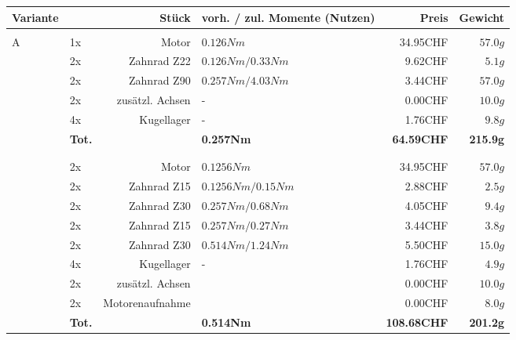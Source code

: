     \begin{longtable}{p{0.5cm}p{0.8cm}rp{3cm}rr}
    \textbf{Variante} & \multicolumn{2}{r}{\textbf{Stück}} & \textbf{vorh. / zul. Momente (Nutzen)} & \textbf{Preis} & \textbf{Gewicht} \\\hline
          &       &                 &                      &          &  \\
    \multirow{9}[2]{*}{A}
          & 1x    & Motor           & $0.126 Nm$           & 34.95CHF & $57.0 g$ \\
          & 2x    & Zahnrad Z22     & $0.126 Nm / 0.33 Nm$ &  9.62CHF & $5.1 g$  \\
          & 2x    & Zahnrad Z90     & $0.257 Nm / 4.03 Nm$ &  3.44CHF & $57.0 g$ \\
          & 2x    & zusätzl. Achsen & -                    &  0.00CHF & $10.0 g$ \\
          & 4x    & Kugellager      & -                    &  1.76CHF & $9.8 g$  \\
          & \textbf{Tot.} &  & \textbf{0.257Nm} & \textbf{64.59CHF} & \textbf{215.9g} \\
    \multirow{10}[2]{*}{B}
  	  &       &                 &                      &          &  \\
          &       &                 &                      &          &  \\
          & 2x    & Motor           & $0.1256 Nm$          & 34.95CHF & $57.0 g$ \\
          & 2x    & Zahnrad Z15     & $0.1256 Nm / 0.15 Nm$& 2.88CHF  & $2.5 g$  \\
          & 2x    & Zahnrad Z30     & $0.257 Nm / 0.68 Nm$ & 4.05CHF  & $9.4 g$  \\
          & 2x    & Zahnrad Z15     & $0.257 Nm / 0.27 Nm$ & 3.44CHF  & $3.8 g$  \\
          & 2x    & Zahnrad Z30     & $0.514 Nm / 1.24 Nm$ & 5.50CHF  & $15.0 g$ \\
          & 4x    & Kugellager      & -                    & 1.76CHF  & $4.9 g$  \\
          & 2x    & zusätzl. Achsen &                      & 0.00CHF  & $10.0 g$ \\
          & 2x    & Motorenaufnahme &                      & 0.00CHF  & $8.0 g$  \\
          & \textbf{Tot.} &       & \textbf{0.514Nm} & \textbf{108.68CHF} & \textbf{201.2g} \\

\end{longtable}
